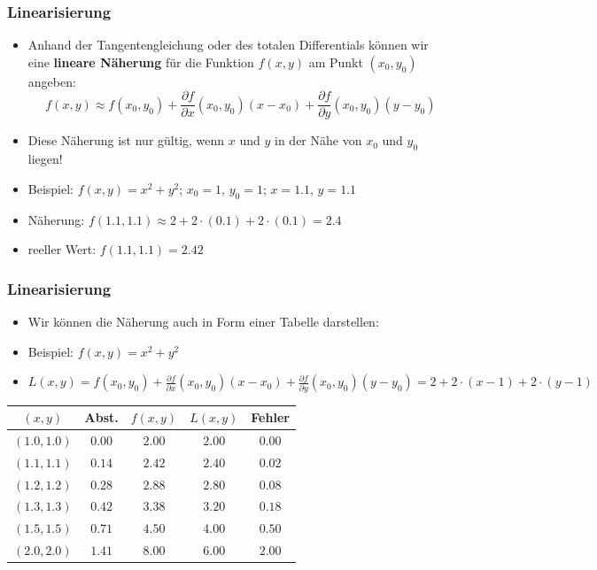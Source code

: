 \begin{frame}
    \frametitle{Linearisierung}

    \begin{itemize}
        \item Anhand der Tangentengleichung oder des totalen Differentials können wir eine {\bf lineare Näherung} für die Funktion $f(x,y)$ am Punkt $(x_0,y_0)$ angeben:
        $$
        f(x,y) \approx f(x_0,y_0) + \frac{\partial f}{\partial x}(x_0,y_0)(x-x_0) + \frac{\partial f}{\partial y}(x_0,y_0)(y-y_0)
        $$
        \item Diese Näherung ist nur gültig, wenn $x$ und $y$ in der Nähe von $x_0$ und $y_0$ liegen!
        \item Beispiel: $f(x,y) = x^2 + y^2$; $x_0=1$, $y_0=1$; $x=1.1$, $y=1.1$
        \item Näherung: $f(1.1,1.1) \approx 2 + 2\cdot(0.1) + 2\cdot(0.1) = 2.4$
        \item reeller Wert: $f(1.1,1.1) = 2.42$
    \end{itemize}
\end{frame}


\begin{frame}
    \frametitle{Linearisierung}

    \begin{itemize}
        \item Wir können die Näherung auch in Form einer Tabelle darstellen:
        \item Beispiel: $f(x,y) = x^2 + y^2$
        \item $L(x,y)=f(x_0,y_0) + \frac{\partial f}{\partial x}(x_0,y_0)(x-x_0) + \frac{\partial f}{\partial y}(x_0,y_0)(y-y_0)=   2 + 2\cdot(x-1) + 2\cdot(y-1)$
    \end{itemize}

\begin{table}[h]
    \begin{tabular}{|c|c|c|c|c|}
    \hline
    $(x,y)$ & Abst. & $f(x,y)$ & $L(x,y)$ & Fehler \\
    \hline
    $(1.0, 1.0)$ & $0.00$ & $2.00$ & $2.00$ & $0.00$ \\
    \hline
    $(1.1, 1.1)$ & $0.14$ & $2.42$ & $2.40$ & $0.02$ \\
    \hline
    $(1.2, 1.2)$ & $0.28$ & $2.88$ & $2.80$ & $0.08$ \\
    \hline
    $(1.3, 1.3)$ & $0.42$ & $3.38$ & $3.20$ & $0.18$ \\
    \hline
    $(1.5, 1.5)$ & $0.71$ & $4.50$ & $4.00$ & $0.50$ \\
    \hline
    $(2.0, 2.0)$ & $1.41$ & $8.00$ & $6.00$ & $2.00$ \\
    \hline
    \end{tabular}
    \end{table}
\end{frame}

